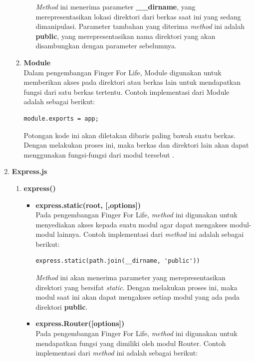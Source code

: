 \begin{enumerate}
\begin{enumerate}
\begin{itemize}
			\textit{Method} ini menerima parameter \textbf{\_\_dirname}, yang merepresentasikan lokasi direktori dari berkas saat ini yang sedang dimanipulasi. Parameter tambahan yang diterima \textit{method} ini adalah \textbf{public}, yang merepresentasikan nama direktori yang akan disambungkan dengan parameter sebelumnya.
		\end{itemize}
		
		
		\item \textbf{Module} \\
		Dalam pengembangan Finger For Life, Module digunakan untuk memberikan akses pada direktori atau berkas lain untuk mendapatkan fungsi dari satu berkas tertentu. Contoh implementasi dari Module adalah sebagai berikut:
\begin{lstlisting}
module.exports = app;
\end{lstlisting}
Potongan kode ini akan diletakan dibaris paling bawah suatu berkas. Dengan melakukan proses ini, maka berkas dan direktori lain akan dapat menggunakan fungsi-fungsi dari modul tersebut .
	\end{enumerate}
	
	\item \textbf{Express.js} \\
	\begin{enumerate}
		\item \textbf{express()}
		\begin{itemize}
			\item \textbf{express.static(root, [,options])} \\
			Pada pengembangan Finger For Life, \textit{method} ini digunakan untuk menyediakan akses kepada suatu modul agar dapat mengakses modul-modul lainnya. Contoh implementasi dari \textit{method} ini adalah sebagai berikut:
\begin{lstlisting}
express.static(path.join(__dirname, 'public'))
\end{lstlisting}
			\textit{Method} ini akan menerima parameter yang merepresentasikan direktori yang bersifat \textit{static}. Dengan melakukan proses ini, maka modul saat ini akan dapat mengakses setiap modul yang ada pada direktori \textbf{public}.
			
			\item \textbf{express.Router([options])} \\
			Pada pengembangan Finger For Life, \textit{method} ini digunakan untuk mendapatkan fungsi yang dimiliki oleh modul Router. Contoh implementasi dari \textit{method} ini adalah sebagai berikut:
			

\end{itemize}
\end{enumerate}
\end{enumerate}
